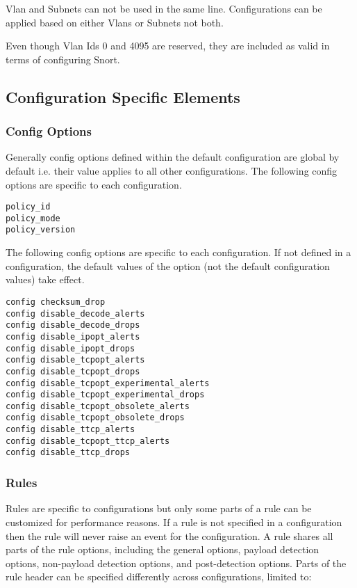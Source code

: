 \documentclass[english]{report}
\newenvironment{note}{
\samepage
    \vspace{10pt}{\textsf{
        {\hspace{7pt}\Huge{$\triangle$\hspace{-12.5pt}{\Large{$^!$}}}}\hspace{5pt}
        {\Large{NOTE}}
    }
    }
   \begin{center}
    \par\vspace{-17pt}

    \begin{lrbox}{\savepar}
    \begin{minipage}[r]{6in}
}
{
    \end{minipage}
    \end{lrbox}
    \fbox{
        \usebox{
            \savepar
	}
    }
    \par\vskip10pt
    \end{center}
}
\newenvironment{note}{
        \begin{rawhtml}
        <p><table border="1"><tr><td><b>
        Note:&nbsp;&nbsp;</b>
        \end{rawhtml}
}{
        \begin{rawhtml}
        </b></td></tr></table></p>
        \end{rawhtml}
}
\begin{document}
\begin{note}
Vlan and Subnets can not be used in the same line. Configurations can be applied 
based on either Vlans or Subnets not both.
\end{note}

\begin{note}
Even though Vlan Ids 0 and 4095 are reserved, they are included as valid in terms
of configuring Snort.
\end{note}

\subsection{Configuration Specific Elements}

\subsubsection{Config Options}
Generally config options defined within the default configuration are global by 
default i.e. their value applies to all other configurations. The following config 
options are specific to each configuration.

\begin{verbatim}
policy_id
policy_mode
policy_version
\end{verbatim}

The following config options are specific to each configuration. If not defined in 
a configuration, the default values of the option (not the default configuration 
values) take effect.

\begin{verbatim}
config checksum_drop
config disable_decode_alerts
config disable_decode_drops
config disable_ipopt_alerts
config disable_ipopt_drops
config disable_tcpopt_alerts
config disable_tcpopt_drops
config disable_tcpopt_experimental_alerts
config disable_tcpopt_experimental_drops
config disable_tcpopt_obsolete_alerts
config disable_tcpopt_obsolete_drops
config disable_ttcp_alerts
config disable_tcpopt_ttcp_alerts
config disable_ttcp_drops
\end{verbatim}

\subsubsection{Rules}
Rules are specific to configurations but only some parts of a rule can be customized 
for performance reasons. If a rule is not specified in a configuration then the rule 
will never raise an event for the configuration. A rule shares all parts of the rule 
options, including the general options, payload detection options, non-payload detection 
options, and post-detection options.  Parts of the rule header can be specified differently 
across configurations, limited to:
\end{document}
